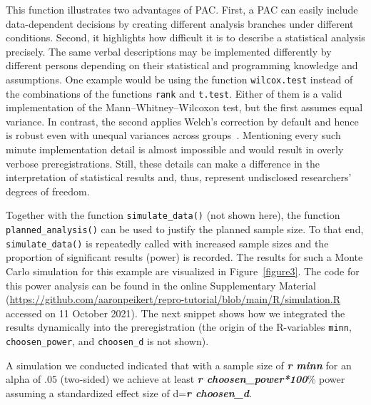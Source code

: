 \documentclass[psych,tutorial,accept,moreauthors,pdftex]{Definitions/mdpi}
\newenvironment{Shaded}{\begin{snugshade}}{\end{snugshade}}
\newcommand{\InformationTok}[1]{\textcolor[rgb]{0.56,0.35,0.01}{\textbf{\textit{#1}}}}
\newcommand{\NormalTok}[1]{#1}
\begin{document}
\begin{paracol}{2}
\switchcolumn


This function illustrates two advantages of PAC. First, a PAC can easily
include data-dependent decisions by creating different analysis branches
under different conditions. Second, it highlights how difficult it is to
describe a statistical analysis precisely. The same verbal descriptions
may be implemented differently by different persons depending on their
statistical and programming knowledge and assumptions. One example would
be using the function \texttt{wilcox.test} instead of the combinations
of the functions \texttt{rank} and \texttt{t.test}. Either of them is a
valid implementation of the Mann--Whitney--Wilcoxon test, but the first
assumes equal variance. In contrast, the second applies Welch's
correction by default and hence is robust even with unequal variances
across groups~\citep{zimmermanRankTransformationsPower1993}. Mentioning
every such minute implementation detail is almost impossible and would
result in overly verbose preregistrations. Still, these details can make
a difference in the interpretation of statistical results and, thus,
represent undisclosed researchers' degrees of freedom.

Together with the function \texttt{simulate\_data()} (not shown here),
the function \texttt{planned\_\linebreak analysis()} can be used to justify the
planned sample size. To that end, \texttt{simulate\_data()} is
repeatedly called with increased sample sizes and the proportion of
significant results (power) is recorded. The results for such a Monte
Carlo simulation for this example are visualized in {Figure~\ref{figure3}.}
 The code
for this power analysis can be found in the {online Supplementary Material}
(\url{https://github.com/aaronpeikert/repro-tutorial/blob/main/R/simulation.R} accessed on 11 October 2021). The next snippet shows how we integrated the
results dynamically into the preregistration (the origin of the
R-variables \texttt{minn}, \texttt{choosen\_power}, and
\texttt{choosen\_d} is not shown).




\vspace{+6pt}
\end{paracol}
\nointerlineskip
\begin{adjustwidth}{0.5cm}{0cm} 
\begin{Shaded}
\begin{Highlighting}[]
\NormalTok{A simulation we conducted indicated that with a sample size of }\InformationTok{\textasciigrave{}r minn\textasciigrave{}}\NormalTok{ for}
\NormalTok{an alpha of .05 (two{-}sided) we achieve at least }\InformationTok{\textasciigrave{}r choosen\_power*100\textasciigrave{}}\NormalTok{\% power}
\NormalTok{assuming a standardized effect size of d=}\InformationTok{\textasciigrave{}r choosen\_d\textasciigrave{}}\NormalTok{.}
\end{Highlighting}
\end{Shaded}
\end{adjustwidth}
\end{document}
